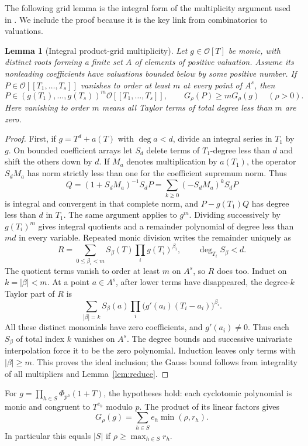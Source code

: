 \documentclass[11pt]{article}
\newtheorem{lemma}[theorem]{Lemma}
\theoremstyle{definition}
\newcommand{\OO}{\mathcal O}
\begin{document}
The following grid lemma is the integral form of the multiplicity argument used in \cite{tors}. We include the proof because it is the key link from combinatorics to valuations.
\begin{lemma}[Integral product-grid multiplicity]\label{lem:grid}
Let $g\in\OO[T]$ be monic, with distinct roots forming a finite set $A$ of elements of positive valuation. Assume its nonleading coefficients have valuations bounded below by some positive number. If $P\in\OO[[T_1,\ldots,T_s]]$ vanishes to order at least $m$ at every point of $A^s$, then
\[
 P\in(g(T_1),\ldots,g(T_s))^m\OO[[T_1,\ldots,T_s]],
 \qquad G_\rho(P)\ge mG_\rho(g)\quad(\rho>0).
\]
Here vanishing to order $m$ means all Taylor terms of total degree less than $m$ are zero.
\end{lemma}
\begin{proof}
First, if $g=T^d+a(T)$ with $\deg a<d$, divide an integral series in $T_1$ by $g$. On bounded coefficient arrays let $S_d$ delete terms of $T_1$-degree less than $d$ and shift the others down by $d$. If $M_a$ denotes multiplication by $a(T_1)$, the operator $S_dM_a$ has norm strictly less than one for the coefficient supremum norm. Thus
\[
 Q=(1+S_dM_a)^{-1}S_dP=\sum_{k\ge0}(-S_dM_a)^kS_dP
\]
is integral and convergent in that complete norm, and $P-g(T_1)Q$ has degree less than $d$ in $T_1$. The same argument applies to $g^m$. Dividing successively by $g(T_i)^m$ gives integral quotients and a remainder polynomial of degree less than $md$ in every variable. Repeated monic division writes the remainder uniquely as
\[
 R=\sum_{0\le\beta_i<m} S_\beta(T)\prod_i g(T_i)^{\beta_i},\qquad
 \deg_{T_i}S_\beta<d.
\]
The quotient terms vanish to order at least $m$ on $A^s$, so $R$ does too. Induct on $k=|\beta|<m$. At a point $a\in A^s$, after lower terms have disappeared, the degree-$k$ Taylor part of $R$ is
\[
 \sum_{|\beta|=k} S_\beta(a)\prod_i\bigl(g'(a_i)(T_i-a_i)\bigr)^{\beta_i}.
\]
All these distinct monomials have zero coefficients, and $g'(a_i)\ne0$. Thus each $S_\beta$ of total index $k$ vanishes on $A^s$. The degree bounds and successive univariate interpolation force it to be the zero polynomial. Induction leaves only terms with $|\beta|\ge m$. This proves the ideal inclusion; the Gauss bound follows from integrality of all multipliers and Lemma~\ref{lem:reduce}.
\end{proof}

For $g=\prod_{h\in S}\Phi_{p^h}(1+T)$, the hypotheses hold: each cyclotomic polynomial is monic and congruent to $T^{e_h}$ modulo $p$. The product of its linear factors gives
\begin{equation}\label{eq:gridcost}
 G_\rho(g)=\sum_{h\in S}e_h\min(\rho,r_h).
\end{equation}
In particular this equals $|S|$ if $\rho\ge\max_{h\in S}r_h$.
\end{document}
